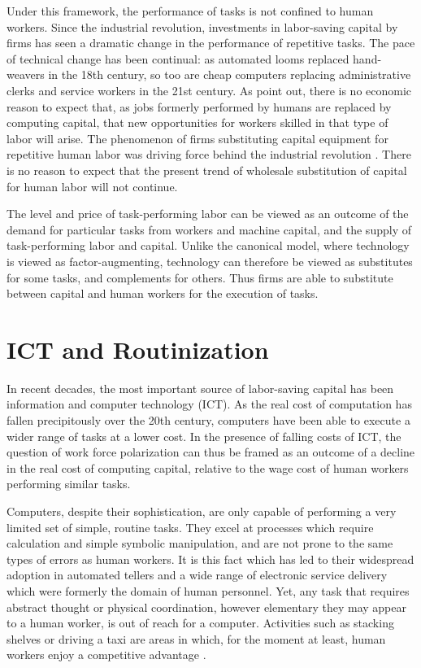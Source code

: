 Under this framework, the performance of tasks is not confined to human workers. Since the industrial revolution, investments in labor-saving capital by firms has seen a dramatic change in the performance of repetitive tasks. The pace of technical change has been continual: as automated looms replaced hand-weavers in the 18th century, so too are cheap computers replacing administrative clerks and service workers in the 21st century. As \citet{Brynjolfsson2011} point out, there is no economic reason to expect that, as jobs formerly performed by humans are replaced by computing capital, that new opportunities for workers skilled in that type of labor will arise. The phenomenon of firms substituting capital equipment for repetitive human labor was driving force behind the industrial revolution \citet{Goldin1998}. There is no reason to expect that the present trend of wholesale substitution of capital for human labor will not continue.

The level and price of task-performing labor can be viewed as an outcome of the demand for particular tasks from workers and machine capital, and the supply of task-performing labor and capital. Unlike the canonical model, where technology is viewed as factor-augmenting,  technology can therefore be viewed as substitutes for some tasks, and complements for others. Thus firms are able to substitute between capital and human workers for the execution of tasks.

\section{ICT and Routinization}

In recent decades, the most important source of labor-saving capital has been information and computer technology (ICT). As the real cost of computation has fallen precipitously over the 20th century, computers have been able to execute a wider range of tasks at a lower cost. In the presence of falling costs of ICT, the question of work force polarization can thus be framed as an outcome of a decline in the real cost of computing capital, relative to the wage cost of human workers performing similar tasks.

Computers, despite their sophistication, are only capable of performing a very limited set of simple, routine tasks. They excel at processes which require calculation and simple symbolic manipulation, and are not prone to the same types of errors as human workers. It is this fact which has led to their widespread adoption in automated tellers and a wide range of electronic service delivery which were formerly the domain of human personnel. Yet, any task that requires abstract thought or physical coordination, however elementary they may appear to a human worker, is out of reach for a computer. Activities such as stacking shelves or driving a taxi are areas in which, for the moment at least, human workers enjoy a competitive advantage \citet{Levy2003}. 

